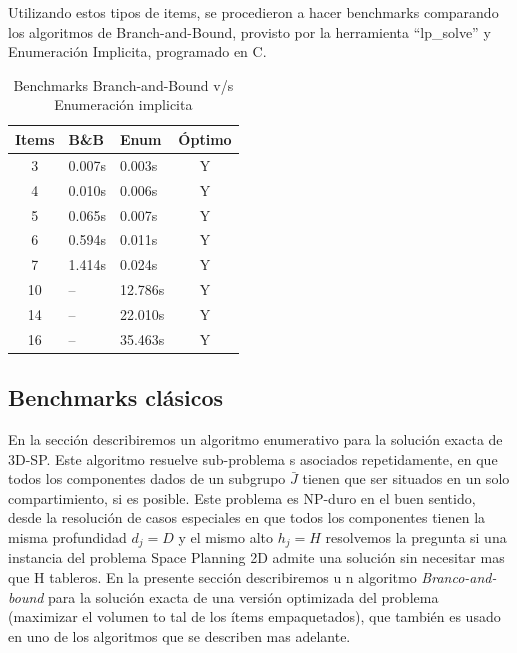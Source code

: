 Utilizando estos tipos de items, se procedieron a hacer benchmarks comparando los algoritmos de Branch-and-Bound, provisto por la herramienta ``lp\_solve'' y Enumeración Implicita, programado en C. \\

\begin{table}[!htp]
\centering
\begin{tabular}{||c|l|l|c||}
\hline\hline
Items & B\&B & Enum & Óptimo\\ \hline
3 & 0.007s & 0.003s & Y \\
4 & 0.010s & 0.006s & Y \\
5 & 0.065s & 0.007s & Y \\
6 & 0.594s & 0.011s & Y \\
7 & 1.414s & 0.024s & Y \\
10 & -- & 12.786s & Y \\
14 & -- & 22.010s & Y \\
16 & -- & 35.463s & Y \\ \hline\hline
\end{tabular}
\caption{Benchmarks Branch-and-Bound v/s Enumeración implicita}\label{tabla:07_01}
\end{table}
\pagebreak

\subsection{Benchmarks clásicos}

En la sección describiremos un algoritmo enumerativo para la solución exacta de 3D-SP. Este algoritmo resuelve sub-problema
s asociados repetidamente, en que todos los componentes dados de un subgrupo \(\bar{J}\) tienen que ser situados en un solo
 compartimiento, si es posible. Este problema es NP-duro en el buen sentido, desde la resolución de casos especiales en que
 todos los componentes tienen la misma profundidad $d_j=D$ y el mismo alto $h_j=H$ resolvemos la pregunta si una instancia
del problema Space Planning 2D admite una solución sin necesitar mas que H tableros. En la presente sección describiremos u
n algoritmo \emph{Branco-and-bound} para la solución exacta de una versión optimizada del problema (maximizar el volumen to
tal de los ítems empaquetados), que también es usado en uno de los algoritmos que se describen mas adelante.

